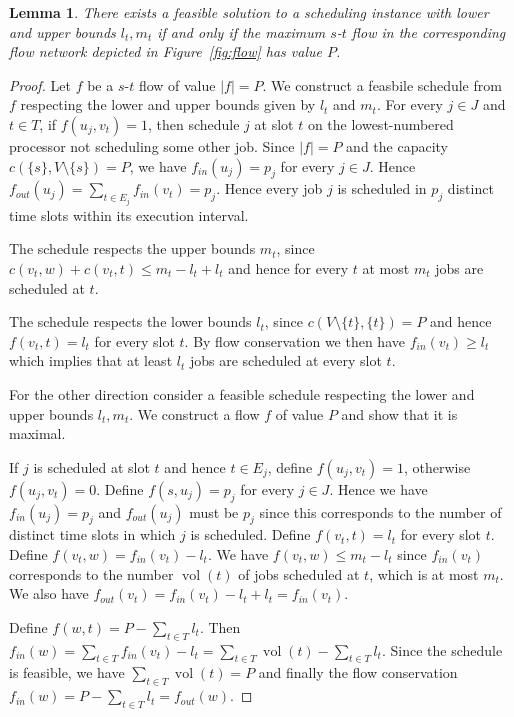 \documentclass[a4paper]{article}
\DeclareMathOperator{\vol}{vol}
\newtheorem{lemma}[theorem]{Lemma}
\begin{document}
\begin{lemma}\label{lemma:flow_feasibility}
  There exists a feasible solution to a scheduling instance with lower and upper bounds $l_t, m_t$ if and only if the maximum $s$-$t$ flow in the corresponding flow network depicted in Figure~\ref{fig:flow} has value $P$.
\end{lemma}
\begin{proof}
  Let $f$ be a $s$-$t$ flow of value $|f| = P$.
  We construct a feasbile schedule from $f$ respecting the lower and upper bounds given by $l_t$ and $m_t$.
  For every $j \in J$ and  $t \in T$, if $f(u_j, v_t) = 1$, then schedule $j$ at slot $t$ on the lowest-numbered processor not scheduling some other job.
  Since $|f| = P$ and the capacity $c(\{s\}, V \setminus \{s\}) = P$, we have $f_{in}(u_j) = p_j$ for every $j \in J$.
  Hence $f_{out}(u_j) = \sum_{t \in E_j} f_{in}(v_t) = p_j$.
  Hence every job $j$ is scheduled in $p_j$ distinct time slots within its execution interval.

  The schedule respects the upper bounds $m_t$, since $c(v_t, w) + c(v_t, t) \leq m_t - l_t + l_t$ and hence for every $t$ at most $m_t$ jobs are scheduled at $t$.

  The schedule respects the lower bounds $l_t$, since
  $c(V \setminus \{t\}, \{t\}) = P$ and hence
  $f(v_t, t) = l_t$ for every slot $t$.
  By flow conservation we then have $f_{in}(v_t) \geq l_t$ which implies that at least $l_t$ jobs are scheduled at every slot $t$.

  For the other direction consider a feasible schedule respecting the lower and upper bounds $l_t, m_t$.
  We construct a flow $f$ of value $P$ and show that it is maximal.

  If $j$ is scheduled at slot $t$ and hence $t \in E_j$,
  define $f(u_j, v_t) = 1$, otherwise $f(u_j, v_t) = 0$.
  Define $f(s, u_j) = p_j$ for every $j \in J$.
  Hence we have $f_{in}(u_j) = p_j$
  and $f_{out}(u_j)$ must be  $p_j$ since this corresponds to the number of distinct time slots in which $j$ is scheduled.
  Define $f(v_t, t) = l_t$ for every slot $t$.
  Define $f(v_t, w) = f_{in}(v_t) - l_t$.
  We have $f(v_t, w) \leq m_t - l_t$ since $f_{in}(v_t)$ corresponds to the number $\vol(t)$ of jobs scheduled at $t$, which is at most $m_t$.
  We also have $f_{out}(v_t) = f_{in}(v_t) - l_t + l_t = f_{in}(v_t)$.

  Define $f(w, t) = P - \sum_{t \in T} l_t$.
  Then $f_{in}(w) = \sum_{t \in T} f_{in}(v_t) - l_t
  = \sum_{t \in T} \vol(t) - \sum_{t \in T} l_t$.
  Since the schedule is feasible, we have $\sum_{t \in T} \vol(t) = P$ and finally the flow conservation $f_{in}(w) = P - \sum_{t \in T} l_t = f_{out}(w)$.

\end{proof}
\end{document}
